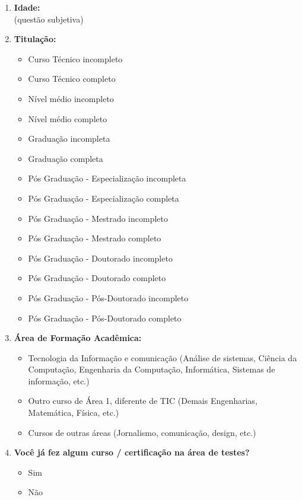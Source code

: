 \begin{enumerate}[label=\bf A\arabic*,leftmargin=1.8cm]
\begin{enumerate}[label= \arabic*]
        \item \textbf{Idade:}\\
        (questão subjetiva)
        
        \item \textbf{Titulação:}
        \begin{itemize}
            \item Curso Técnico incompleto
            \item Curso Técnico completo
            \item Nível médio incompleto
            \item Nível médio completo
            \item Graduação incompleta
            \item Graduação completa
            \item Pós Graduação - Especialização incompleta
            \item Pós Graduação - Especialização completa
            \item Pós Graduação - Mestrado incompleto
            \item Pós Graduação - Mestrado completo
            \item Pós Graduação - Doutorado incompleto
            \item Pós Graduação - Doutorado completo
            \item Pós Graduação - Pós-Doutorado incompleto
            \item Pós Graduação - Pós-Doutorado completo
        \end{itemize}
        
        \item \textbf{Área de Formação Acadêmica:}
        \begin{itemize}
            \item Tecnologia da Informação e comunicação (Análise de sistemas, Ciência da Computação, Engenharia da Computação, Informática, Sistemas de informação, etc.)
            \item Outro curso de Área 1, diferente de TIC (Demais Engenharias, Matemática, Física, etc.)
            \item Cursos de outras áreas (Jornalismo, comunicação, design, etc.)
        \end{itemize}
        
        \item \textbf{Você já fez algum curso / certificação na área de testes?}
        \begin{itemize}
            \item Sim
            \item Não
        \end{itemize}
        

\end{enumerate}
\end{enumerate}
